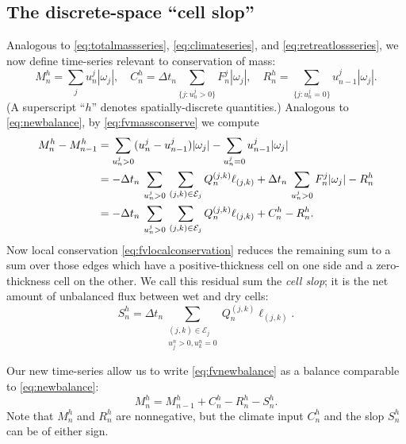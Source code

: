 \documentclass[final,onefignum]{siamart190516}
\begin{document}
\subsection{The discrete-space ``cell slop''}  \label{subsec:slop}  Analogous to \eqref{eq:totalmassseries}, \eqref{eq:climateseries}, and \eqref{eq:retreatlossseries}, we now define time-series relevant to conservation of mass:
\begin{equation}
M_n^h = \sum_j u_n^j |\omega_j|, \quad C_n^h = \Delta t_n\!\!\sum_{\{j:u_n^j>0\}} F_n^j |\omega_j|, \quad R_n^h = \sum_{\{j:u_n^j=0\}} u_{n-1}^j |\omega_j|.  \label{eq:fvtimeseriesdefn}
\end{equation}
(A superscript ``$h$'' denotes spatially-discrete quantities.)  Analogous to \eqref{eq:newbalance}, by \eqref{eq:fvmassconserve} we compute
\begin{align}
M_n^h - M_{n-1}^h &= \sum_{u_n^j>0} (u_n^j - u_{n-1}^j) |\omega_j| - \sum_{u_n^j=0} u_{n-1}^j |\omega_j| \notag \\
   &= - \Delta t_n\,\sum_{u_n^j>0}\, \sum_{(j,k)\in\mathcal{E}_j} Q_n^{(j,k)} \ell_{(j,k)} + \Delta t_n\,\sum_{u_n^j>0} F_n^j |\omega_j| - R_n^h \notag \\
   &= - \Delta t_n\,\sum_{u_n^j>0}\, \sum_{(j,k)\in\mathcal{E}_j} Q_n^{(j,k)} \ell_{(j,k)} + C_n^h - R_n^h.  \label{eq:fvnewbalance}
\end{align}
Now local conservation \eqref{eq:fvlocalconservation} reduces the remaining sum to a sum over those edges which have a positive-thickness cell on one side and a zero-thickness cell on the other.  We call this residual sum the \emph{cell slop}; it is the net amount of unbalanced flux between wet and dry cells:
\begin{equation}
S_n^h = \Delta t_n \sum_{\begin{smallmatrix} (j,k)\in\mathcal{E}_j \\ u_j^n > 0, u_k^n = 0\end{smallmatrix}} Q_n^{(j,k)} \ell_{(j,k)}. \label{eq:fvderiveslop}
\end{equation}

Our new time-series allow us to write \eqref{eq:fvnewbalance} as a balance comparable to \eqref{eq:newbalance}:
\begin{equation}
  M_n^h = M_{n-1}^h + C_n^h - R_n^h - S_n^h. \label{eq:fvfinalbalance}
\end{equation}
Note that $M_n^h$ and $R_n^h$ are nonnegative, but the climate input $C_n^h$ and the slop $S_n^h$ can be of either sign.
\end{document}
